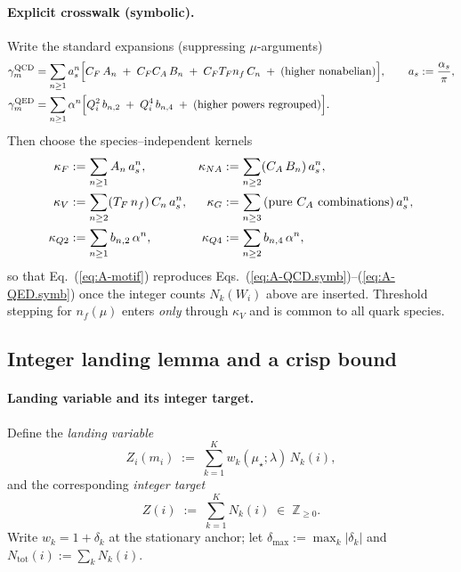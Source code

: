 \documentclass[aps,prd,onecolumn,amsmath,amssymb,superscriptaddress,nofootinbib,showpacs,showkeys]{revtex4-2}
\begin{document}
\paragraph{Explicit crosswalk (symbolic).}
Write the standard expansions (suppressing $\mu$-arguments)
\begin{align}
  \gamma^{\mathrm{QCD}}_m
  &=\sum_{n\ge1} a_s^n
    \Bigl[
      C_F\,A_n\;+\;C_FC_A\,B_n\;+\;C_FT_Fn_f\,C_n\;+\;\text{(higher nonabelian)}
    \Bigr],\qquad a_s:=\frac{\alpha_s}{\pi},\label{eq:A-QCD.symb}\\
  \gamma^{\mathrm{QED}}_m
  &=\sum_{n\ge1}\alpha^n
    \Bigl[
      Q_i^2\,b_{n,2}\;+\;Q_i^4\,b_{n,4}\;+\;\text{(higher powers regrouped)}
    \Bigr].\label{eq:A-QED.symb}
\end{align}
Then choose the species--independent kernels
\begin{align}
  \kappa_F    &:= \sum_{n\ge1} A_n\,a_s^n,           &
  \kappa_{NA} &:= \sum_{n\ge2} (C_A\,B_n)\,a_s^n,\notag\\
  \kappa_V    &:= \sum_{n\ge2} (T_F\,n_f)\,C_n\,a_s^n,&
  \kappa_G    &:= \sum_{n\ge3} \text{(pure $C_A$ combinations)}\,a_s^n,\notag\\
  \kappa_{Q2} &:= \sum_{n\ge1} b_{n,2}\,\alpha^n,     &
  \kappa_{Q4} &:= \sum_{n\ge2} b_{n,4}\,\alpha^n,\label{eq:A-kappa.def}
\end{align}
so that Eq.~(\ref{eq:A-motif}) reproduces Eqs.~(\ref{eq:A-QCD.symb})–(\ref{eq:A-QED.symb})
once the integer counts $N_k(W_i)$ above are inserted.  Threshold stepping for $n_f(\mu)$ enters \emph{only} through $\kappa_V$ and is common to all quark species.


\subsection{Integer landing lemma and a crisp bound}

\paragraph{Landing variable and its integer target.}
Define the \emph{landing variable}
\begin{equation}
  Z_i(m_i)\;:=\;\sum_{k=1}^K w_k(\mu_\star;\lambda)\,N_k(i),
  \label{eq:A-Zi}
\end{equation}
and the corresponding \emph{integer target}
\begin{equation}
  Z(i)\;:=\;\sum_{k=1}^K N_k(i)\;\in\;\mathbb Z_{\ge 0}.
  \label{eq:A-Zint}
\end{equation}
Write $w_k=1+\delta_k$ at the stationary anchor; let $\delta_{\max}:=\max_k|\delta_k|$ and $N_{\mathrm{tot}}(i):=\sum_k N_k(i)$.
\end{document}
